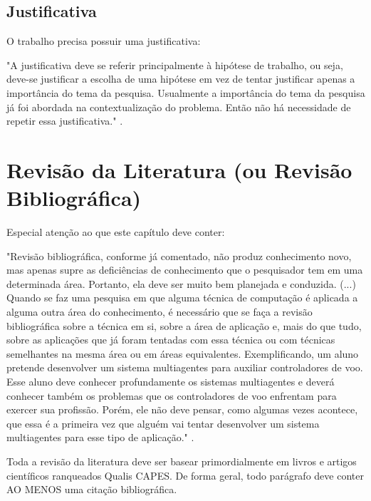 \documentclass[
	article,			%
	12pt,				%
	oneside,			%
	a4paper,			%
    BIBLATEX,           %
	english,			%
	brazil,				%
	sumario=tradicional
	]{abntex2}
\begin{document}
\subsection{Justificativa}    

    O trabalho precisa possuir uma justificativa:
    \begin{citacao}
    "A justificativa deve se referir principalmente à hipótese de trabalho, ou seja, deve-se justificar a escolha de uma
    hipótese em vez de tentar justificar apenas a importância do tema da pesquisa. Usualmente a importância do
    tema da pesquisa já foi abordada na contextualização do problema. Então não há necessidade de repetir essa
    justificativa."
    \lipsum[5] \cite{PESQUISA:RAUL}.
    \end{citacao}


\section{Revisão da Literatura (ou Revisão Bibliográfica)}

Especial atenção ao que este capítulo deve conter:
    \begin{citacao}
    "Revisão bibliográfica, conforme já comentado, não produz conhecimento novo, mas apenas supre as
    deficiências de conhecimento que o pesquisador tem em uma determinada área. Portanto, ela deve ser muito
    bem planejada e conduzida.
    (...)
    Quando se faz uma pesquisa em que alguma técnica de computação é aplicada a alguma outra área do
    conhecimento, é necessário que se faça a revisão bibliográfica sobre a técnica em si, sobre a área de aplicação e,
    mais do que tudo, sobre as aplicações que já foram tentadas com essa técnica ou com técnicas semelhantes na
    mesma área ou em áreas equivalentes. Exemplificando, um aluno pretende desenvolver um sistema
    multiagentes para auxiliar controladores de voo. Esse aluno deve conhecer profundamente os sistemas
    multiagentes e deverá conhecer também os problemas que os controladores de voo enfrentam para exercer sua
    profissão. Porém, ele não deve pensar, como algumas vezes acontece, que essa é a primeira vez que alguém vai
    tentar desenvolver um sistema multiagentes para esse tipo de aplicação."
    \cite{PESQUISA:RAUL}.
    \end{citacao}

Toda a revisão da literatura deve ser basear primordialmente em livros e artigos científicos ranqueados Qualis CAPES. De forma geral, todo parágrafo deve conter AO MENOS uma citação bibliográfica.
\end{document}
